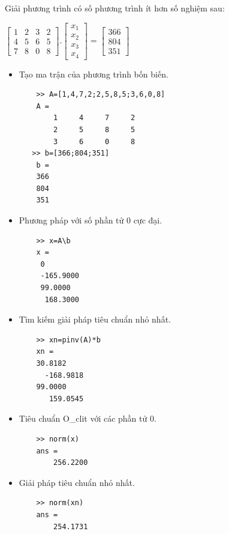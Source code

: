 \documentclass[12pt,a4paper]{article}
\begin{document}
\begin{example}
Giải phương trình có số phương trình ít hơn số nghiệm sau:
\begin{center}
	$\begin{bmatrix} 1 & 2 & 3 & 2 \\ 4 & 5 & 6 & 5 \\ 7 & 8 & 0 & 8 \end{bmatrix}.\begin{bmatrix} { x }_{ 1 } \\ { x }_{ 2 } \\ { x }_{ 3 } \\ { x }_{ 4 } \end{bmatrix}=\begin{bmatrix} 366 \\ 804 \\ 351 \end{bmatrix}$
\end{center}
\begin{itemize}
	\item Tạo ma trận của phương trình bốn biến.
\begin{lstlisting}
	>> A=[1,4,7,2;2,5,8,5;3,6,0,8]
	A =
     	1     4     7     2
     	2     5     8     5
     	3     6     0     8
   >> b=[366;804;351]
	b =
   	366
   	804
   	351
\end{lstlisting}
	\item Phương pháp với số phần tử 0 cực đại.
\begin{lstlisting}
	>> x=A\b
	x =
     0
 	 -165.9000
     99.0000
  	  168.3000
\end{lstlisting}
	\item Tìm kiếm giải pháp tiêu chuẩn nhỏ nhất.
\begin{lstlisting}
	>> xn=pinv(A)*b
	xn =
   	30.8182
 	  -168.9818
   	99.0000
  	   159.0545
\end{lstlisting}
	\item Tiêu chuẩn O\_clit với các phần tử 0.
\begin{lstlisting}
	>> norm(x)
	ans =
  		256.2200
\end{lstlisting}
	\item Giải pháp tiêu chuẩn nhỏ nhất.
\begin{lstlisting}
	>> norm(xn)
	ans =
  		254.1731
\end{lstlisting}
\end{itemize}
\end{example}
\end{document}
